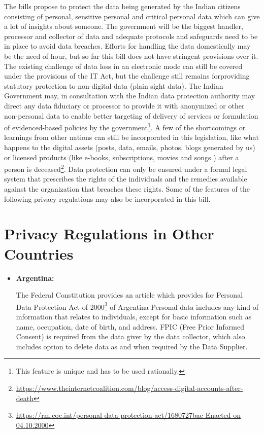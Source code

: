 \begin{multicols}{2}
\begin{itemize}
The bills propose to protect the data being generated by the Indian citizens consisting of personal, sensitive personal and critical personal data which can give a lot of insights about someone. The government will be the biggest handler, processor and collector of data and adequate protocols and safeguards need to be in place to avoid data breaches. Efforts for handling the data domestically may be the need of hour, but so far this bill does not have stringent provisions over it. The existing challenge of data loss in an electronic mode can still be covered under the provisions of the IT Act, but the challenge still remains for\break providing statutory protection to non-digital data (plain sight data). The Indian Government may, in consultation with the Indian data protection authority may direct any data fiduciary or processor to provide it with anonymized or other non-personal data to enable better targeting of delivery of services or formulation of evidenced-based policies by the government\footnote{ This feature is unique and has to be used rationally.}. A few of the shortcomings or learnings from other nations can still be incorporated in this legislation, like what happens to the digital assets (posts, data, emails, photos, blogs generated by us) or licensed products (like e-books, subscriptions, movies and songs ) after a person is deceased\footnote{\url{https://www.theinternetcoalition.com/blog/access-digital-accounts-after-death}}.  Data protection can only be ensured under a formal legal system that prescribes the rights of the individuals and the remedies available against the organization that breaches these rights. Some of the features of the following privacy regulations may also be incorporated in this bill.
\end{itemize}


\section{Privacy Regulations in Other\\ Countries}

\begin{itemize}

\item[{\bf 1.}] \textbf{Argentina:}

The Federal Constitution provides an article which provides for Personal Data Protection Act of 2000\footnote{\url{https://rm.coe.int/personal-data-protection-act/1680727bac Enacted on 04.10.2000}} of Argentina Personal data includes any kind of information that relates to individuals, except for basic information such as name, occupation, date of birth, and address. FPIC (Free Prior Informed Consent) is required from the data giver by the data collector, which also includes option to delete data as and when required by the Data Supplier. 


\end{itemize}
\end{multicols}
